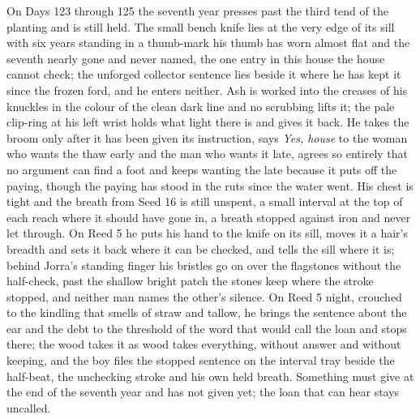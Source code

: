 \documentclass{design/chronicle}
\begin{document}
{On Days 123 through 125 the seventh year presses past the third tend of the planting and is still held. The small bench knife lies at the very edge of its sill with six years standing in a thumb-mark his thumb has worn almost flat and the seventh nearly gone and never named, the one entry in this house the house cannot check; the unforged collector sentence lies beside it where he has kept it since the frozen ford, and he enters neither. Ash is worked into the creases of his knuckles in the colour of the clean dark line and no scrubbing lifts it; the pale clip-ring at his left wrist holds what light there is and gives it back. He takes the broom only after it has been given its instruction, says \emph{Yes, house} to the woman who wants the thaw early and the man who wants it late, agrees so entirely that no argument can find a foot and keeps wanting the late because it puts off the paying, though the paying has stood in the ruts since the water went. His chest is tight and the breath from Seed 16 is still unspent, a small interval at the top of each reach where it should have gone in, a breath stopped against iron and never let through. On Reed 5 he puts his hand to the knife on its sill, moves it a hair’s breadth and sets it back where it can be checked, and tells the sill where it is; behind Jorra’s standing finger his bristles go on over the flagstones without the half-check, past the shallow bright patch the stones keep where the stroke stopped, and neither man names the other’s silence. On Reed 5 night, crouched to the kindling that smells of straw and tallow, he brings the sentence about the ear and the debt to the threshold of the word that would call the loan and stops there; the wood takes it as wood takes everything, without answer and without keeping, and the boy files the stopped sentence on the interval tray beside the half-beat, the unchecking stroke and his own held breath. Something must give at the end of the seventh year and has not given yet; the loan that can hear stays uncalled.

}
\end{document}
